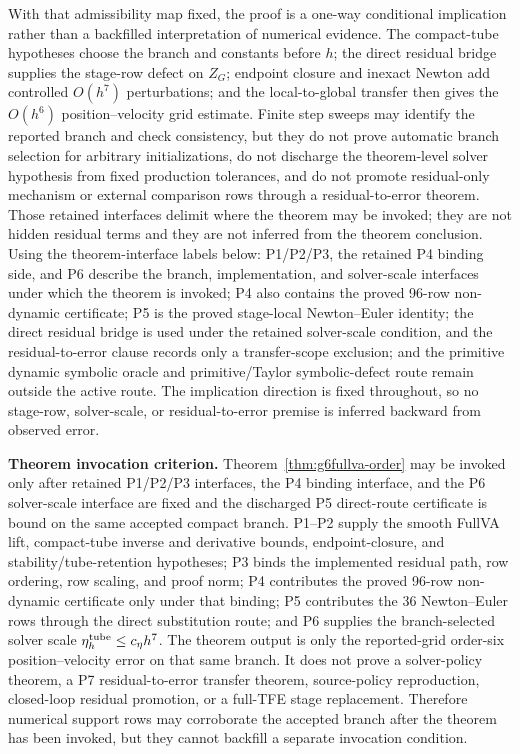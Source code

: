 \documentclass[preprint,12pt]{elsarticle}
\newcommand{\tfe}{TFE}
\begin{document}
With that admissibility map fixed, the proof is a one-way conditional
implication rather than a backfilled interpretation of numerical evidence.
The compact-tube hypotheses choose the branch and constants before \(h\); the
direct residual bridge supplies the stage-row defect on \(Z_G\); endpoint
closure and inexact Newton add controlled \(O(h^7)\) perturbations; and the
local-to-global transfer then gives the \(O(h^6)\) position--velocity grid
estimate.  Finite step sweeps may identify the reported branch and check
consistency, but they do not prove automatic branch selection for arbitrary
initializations, do not discharge the theorem-level solver hypothesis from fixed
production tolerances, and do not promote residual-only mechanism or
external comparison rows through a residual-to-error theorem.  Those retained
interfaces delimit where the theorem may be invoked; they are not hidden
residual terms and they are not inferred from the theorem conclusion.
Using the theorem-interface labels below:
P1/P2/P3, the retained P4 binding side, and P6 describe the branch,
implementation, and solver-scale interfaces under which the theorem is
invoked; P4 also contains the proved 96-row non-dynamic certificate; P5 is the proved stage-local Newton--Euler identity;
the direct residual bridge is used under the retained solver-scale condition,
and the residual-to-error clause records only a transfer-scope exclusion; and the
primitive dynamic symbolic oracle and primitive/Taylor symbolic-defect route
remain outside the active route. The implication direction is fixed
throughout, so no stage-row, solver-scale, or residual-to-error premise is
inferred backward from observed error.

\noindent\textbf{Theorem invocation criterion.}
Theorem~\ref{thm:g6fullva-order}
may be invoked only after retained P1/P2/P3 interfaces, the P4 binding
interface, and the P6 solver-scale interface are fixed and the discharged P5
direct-route certificate is bound on the same accepted
compact branch. P1--P2 supply the smooth FullVA lift, compact-tube inverse and
derivative bounds, endpoint-closure, and stability/tube-retention hypotheses;
P3 binds the implemented residual path, row ordering, row scaling, and proof
norm; P4 contributes the proved 96-row non-dynamic certificate only under that
binding; P5 contributes the 36 Newton--Euler rows through the direct
substitution route; and P6 supplies the
branch-selected solver scale \(\eta_h^{\rm tube}\le c_\eta h^7\). The theorem
output is only the reported-grid order-six position--velocity error on that
same branch. It does not prove a solver-policy theorem, a P7
residual-to-error transfer theorem, source-policy reproduction, closed-loop
residual promotion, or a full-\tfe{} stage replacement. Therefore numerical
support rows may corroborate the accepted branch after the theorem has been
invoked, but they cannot backfill a separate invocation condition.
\end{document}

